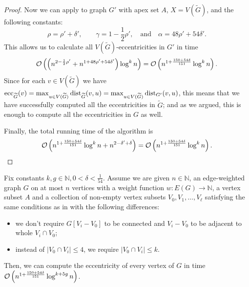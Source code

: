 \begin{proof}
Now we can apply  to graph $G'$ with apex set $A$, $X = V(\widetilde{G})$, and the following constants: $$\rho = \rho' + \delta',\qquad \gamma = 1 - \frac{1}{2}\rho',\quad \textrm{and}\quad \alpha = 48\rho' + 54 \delta'.$$ This allows us to calculate all $V(\widetilde{G})$-eccentricities in $G'$ in time
$$
\mathcal{O} \left( \left(
	n^{ 2 - \frac{1}{2} \rho' } +
	n^{ 1 + 48\rho' + 54 \delta' }
\right) \log^k n \right) =
\mathcal{O} \left( n^{1 + \frac{150 + 54 \delta}{151}} \log^k n \right).
$$
Since for each $v\in V(\widetilde{G})$ we have $\mathrm{ecc}_{\widetilde{G}}(v) = \max_{u \in V(\widetilde{G})} \mathrm{dist}_{\widetilde{G}}(v, u) = \max_{u \in V(\widetilde{G})} \mathrm{dist}_{G'}(v, u)$, this means that we have successfully computed all the eccentricities in $\widetilde{G}$; and as we argued, this is enough to compute all the eccentricities in $G$ as well.

Finally, the total running time of the algorithm is
$$
\mathcal{O} \left( n^{1 + \frac{150 + 54 \delta}{151}} \log^k n + n^{2 - \delta' + \delta} \right) =
\mathcal{O} \left( n^{1 + \frac{150 + 54 \delta}{151}} \log^k n \right).
$$\qedhere
\end{proof}


\begin{lemma}\label{l:star2}
Fix constants $k, g \in \mathbb{N}, 0 < \delta < \frac{1}{54}$. Assume we are given $n \in \mathbb{N}$, an edge-weighted graph $G$ on at most $n$ vertices with a weight function $w \colon E(G) \to \mathbb{N}$, a vertex subset $A$ and a collection of non-empty vertex subsets $V_0, V_1, \dots, V_\ell$ satisfying the same conditions as in  with the following differences:
\begin{itemize}
	\item we don't require $G[V_i - V_0]$ to be connected and $V_i - V_0$ to be adjacent to whole $V_i \cap V_0$;
	\item instead of $|V_0 \cap V_i| \leq 4$, we require $|V_0 \cap V_i| \leq k$.
\end{itemize}
Then, we can compute the eccentricity of every vertex of $G$ in time $\mathcal{O} \left( n^{1 + \frac{150 + 54 \delta}{151}} \log^{k + 5g} n \right)$.
\end{lemma}

